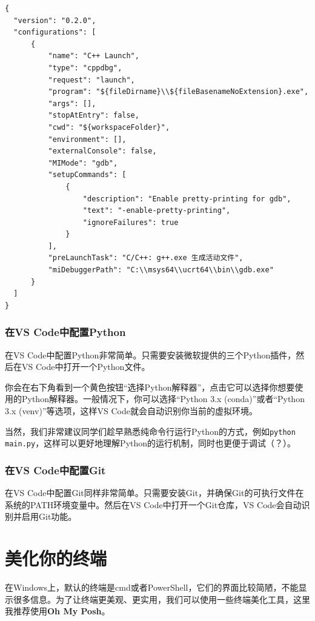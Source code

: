 \documentclass[../main.tex]{subfiles}
\begin{document}
\begin{verbatim}
{
  "version": "0.2.0",
  "configurations": [
      {
          "name": "C++ Launch",
          "type": "cppdbg",
          "request": "launch",
          "program": "${fileDirname}\\${fileBasenameNoExtension}.exe",
          "args": [],
          "stopAtEntry": false,
          "cwd": "${workspaceFolder}",
          "environment": [],
          "externalConsole": false,
          "MIMode": "gdb",
          "setupCommands": [
              {
                  "description": "Enable pretty-printing for gdb",
                  "text": "-enable-pretty-printing",
                  "ignoreFailures": true
              }
          ],
          "preLaunchTask": "C/C++: g++.exe 生成活动文件",
          "miDebuggerPath": "C:\\msys64\\ucrt64\\bin\\gdb.exe"
      }
  ]
}
\end{verbatim}

\subsubsection{在VS Code中配置Python}

在VS Code中配置Python非常简单。只需要安装微软提供的三个Python插件，然后在VS Code中打开一个Python文件。

你会在右下角看到一个黄色按钮“选择Python解释器”，点击它可以选择你想要使用的Python解释器。一般情况下，你可以选择“Python 3.x (conda)”或者“Python 3.x (venv)”等选项，这样VS Code就会自动识别你当前的虚拟环境。

当然，我们非常建议同学们趁早熟悉纯命令行运行Python的方式，例如\texttt{python main.py}，这样可以更好地理解Python的运行机制，同时也更便于调试（？）。

\subsubsection{在VS Code中配置Git}

在VS Code中配置Git同样非常简单。只需要安装Git，并确保Git的可执行文件在系统的PATH环境变量中。然后在VS Code中打开一个Git仓库，VS Code会自动识别并启用Git功能。

\section{美化你的终端}

在Windows上，默认的终端是cmd或者PowerShell，它们的界面比较简陋，不能显示很多信息。为了让终端更美观、更实用，我们可以使用一些终端美化工具，这里我推荐使用\textbf{Oh My Posh}。
\end{document}
